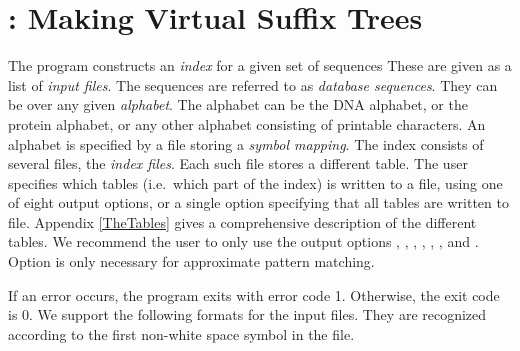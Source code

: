 \documentclass[12pt,titlepage]{article}
\makeatletter
\newcommand{\Program}[2]{\index{#2@#1}}
\makeatother
\begin{document}
\section[\MKV]{\MKV: Making Virtual Suffix Trees}\label{MKV}\Program{\MKV}{mkvtree}
The program \MKV constructs an 
\emph{index} for a given set of sequences
These are given as a list of \emph{input files}.  
The sequences are referred to as
\emph{database sequences}.
They can be over any given  \emph{alphabet}.
The alphabet can be
the  DNA alphabet, or the  
protein alphabet, or any other alphabet consisting of printable characters.
An alphabet is specified by a file storing a 
 \emph{symbol mapping}. The index consists of several 
files, the 
\emph{index files}. Each such file stores a different table.
The user specifies which tables (i.e.\ which part of the index)
is written to a file, using one of eight output options, or a single
option specifying that all tables are written to file. 
Appendix \ref{TheTables} gives a comprehensive description of
the different tables. We recommend the user to only use the
output options , , , 
, , , and .
Option  is only necessary for approximate pattern matching.

If an error occurs, the program exits with 
 error code 1. Otherwise, the exit code is 0.
We support the following formats for the input files.
They are recognized according to the first non-white space symbol in 
the file. 
\end{document}
